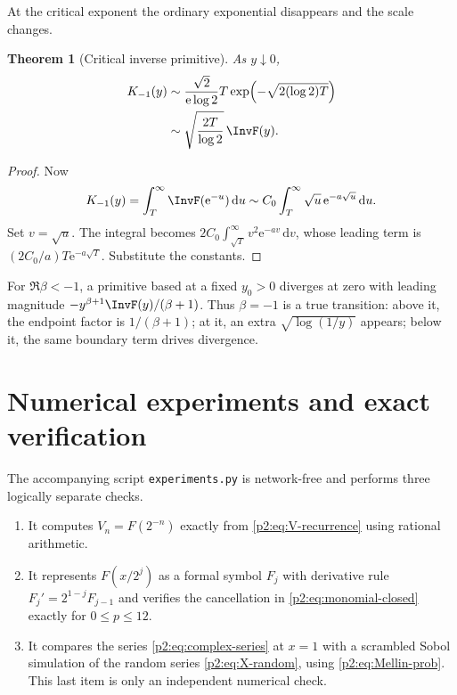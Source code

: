 \documentclass[11pt,oneside]{article}
\newtheorem{theorem}{Theorem}[section]
\theoremstyle{definition}
\theoremstyle{remark}
\newcommand{\dd}{\,\mathrm d}
\newcommand{\e}{\mathrm e}
\newcommand{\1}{\mathbf 1}
\begin{document}
At the critical exponent the ordinary exponential disappears and the scale
changes.

\begin{theorem}[Critical inverse primitive]
\label{p2:thm:inverse-endpoint-critical}
As $y\downarrow0$,
\begin{align}
 K_{-1}(y)
 &\sim\frac{\sqrt2}{\e\log2}
 T\exp\!\left(-\sqrt{2(\log2)T}\right)                    \label{p2:eq:Kminus1-leading}\\
 &\sim\sqrt{\frac{2T}{\log2}}\,\InvF(y).                  \label{p2:eq:Kminus1-ratio}
\end{align}
\end{theorem}

\begin{proof}
Now
\[
 K_{-1}(y)=\int_T^\infty\InvF(\e^{-u})\dd u
 \sim C_0\int_T^\infty\sqrt u\,\e^{-a\sqrt u}\dd u.
\]
Set $v=\sqrt u$.  The integral becomes
$2C_0\int_{\sqrt T}^\infty v^2\e^{-av}\dd v$, whose leading
term is $(2C_0/a)T\e^{-a\sqrt T}$.  Substitute the constants.
\end{proof}

For $\Re\beta<-1$, a primitive based at a fixed $y_0>0$ diverges at zero with
leading magnitude $-y^{\beta+1}\InvF(y)/(\beta+1)$.  Thus $\beta=-1$ is a true
transition: above it, the endpoint factor is $1/(\beta+1)$; at it, an extra
$\sqrt{\log(1/y)}$ appears; below it, the same boundary term drives divergence.

\section{Numerical experiments and exact verification}
\label{p2:sec:numerics}

The accompanying script \texttt{experiments.py} is network-free and performs
three logically separate checks.

\begin{enumerate}
\item It computes $V_n=F(2^{-n})$ exactly from \eqref{p2:eq:V-recurrence} using
rational arithmetic.
\item It represents $F(x/2^j)$ as a formal symbol $F_j$ with derivative rule
$F_j'=2^{1-j}F_{j-1}$ and verifies the cancellation in
\eqref{p2:eq:monomial-closed} exactly for $0\le p\le12$.
\item It compares the series \eqref{p2:eq:complex-series} at $x=1$ with a
scrambled Sobol simulation of the random series \eqref{p2:eq:X-random}, using
\eqref{p2:eq:Mellin-prob}.  This last item is only an independent numerical check.
\end{enumerate}
\end{document}
